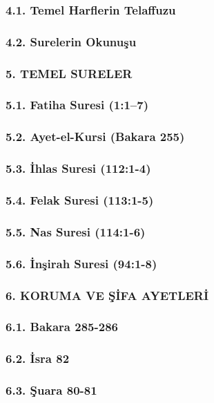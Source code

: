 \documentclass[12pt,a4paper]{article}
\begin{document}
\subsubsection{4.1. Temel Harflerin Telaffuzu}
\subsubsection{4.2. Surelerin Okunuşu}
\subsubsection{5. TEMEL SURELER}
\subsubsection{5.1. Fatiha Suresi (1:1–7)}
\subsubsection{5.2. Ayet-el-Kursi (Bakara 255)}
\subsubsection{5.3. İhlas Suresi (112:1-4)}
\subsubsection{5.4. Felak Suresi (113:1-5)}
\subsubsection{5.5. Nas Suresi (114:1-6)}
\subsubsection{5.6. İnşirah Suresi (94:1-8)}
\subsubsection{6. KORUMA VE ŞİFA AYETLERİ}
\subsubsection{6.1. Bakara 285-286}
\subsubsection{6.2. İsra 82}
\subsubsection{6.3. Şuara 80-81}
\end{document}
